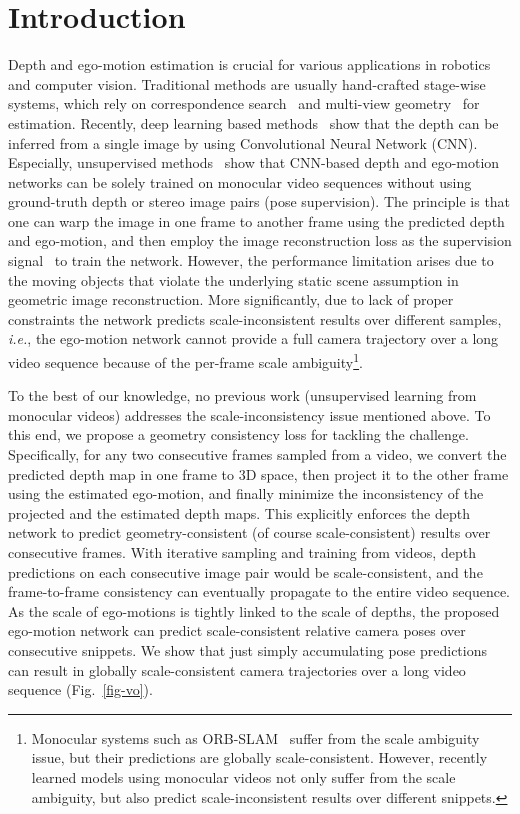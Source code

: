 \documentclass{article}
\newcommand{\figref}[1]{Fig.~\ref{#1}}
\def\ie{\emph{i.e.}}
\begin{document}
\section{Introduction}\label{sec-introduction}
Depth and ego-motion estimation is crucial for various applications in robotics and computer vision.
Traditional methods are usually hand-crafted stage-wise systems, which rely on correspondence search~\cite{lowe2004distinctive, Bian_2017_CVPR} and multi-view geometry~\cite{hartley2003multiple, bian2019bench} for estimation. 
Recently, deep learning based methods~\cite{eigen2014depth, liu2016learning} show that the depth can be inferred from a single image by using Convolutional Neural Network (CNN).
Especially, unsupervised methods~\cite{zhou2017unsupervised, mahjourian2018unsupervised,yin2018geonet,zou2018df, ranjan2019cc} show that CNN-based depth and ego-motion networks can be solely trained on monocular video sequences without using ground-truth depth or stereo image pairs (pose supervision).
The principle is that one can warp the image in one frame to another frame using the predicted depth and ego-motion, and then employ the image reconstruction loss as the supervision signal~\cite{zhou2017unsupervised} to train the network.
However, the performance limitation arises due to the moving objects that violate the underlying static scene assumption in geometric image reconstruction.
More significantly, due to lack of proper constraints the network predicts scale-inconsistent results over different samples, \ie, the ego-motion network cannot provide a full camera trajectory over a long video sequence because of the per-frame scale ambiguity\footnote{Monocular systems such as ORB-SLAM~\cite{mur2015orb} suffer from the scale ambiguity issue, but their predictions are globally scale-consistent. However, recently learned models using monocular videos not only suffer from the scale ambiguity, but also predict scale-inconsistent results over different snippets.}.

To the best of our knowledge, no previous work (unsupervised learning from monocular videos) addresses the scale-inconsistency issue mentioned above.
To this end, we propose a geometry consistency loss for tackling the challenge.
Specifically, for any two consecutive frames sampled from a video, we convert the predicted depth map in one frame to 3D space, then project it to the other frame using the estimated ego-motion, and finally minimize the inconsistency of the projected and the estimated depth maps.
This explicitly enforces the depth network to predict geometry-consistent (of course scale-consistent) results over consecutive frames.
With iterative sampling and training from videos, depth predictions on each consecutive image pair would be scale-consistent, and the frame-to-frame consistency can eventually propagate to the entire video sequence.
As the scale of ego-motions is tightly linked to the scale of depths, the proposed ego-motion network can predict scale-consistent relative camera poses over consecutive snippets.
We show that just simply accumulating pose predictions can result in globally scale-consistent camera trajectories over a long video sequence (\figref{fig-vo}).
\end{document}
